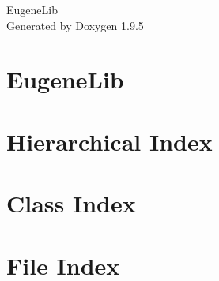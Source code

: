 \documentclass[twoside]{book}
\newcommand{\+}{\discretionary{\mbox{\scriptsize$\hookleftarrow$}}{}{}}
\newcommand{\clearemptydoublepage}{%
    \newpage{\pagestyle{empty}\cleardoublepage}%
  }
\begin{document}
  \raggedbottom
    \hypersetup{pageanchor=false,
                bookmarksnumbered=true,
                pdfencoding=unicode
               }
  \begin{titlepage}
  \vspace*{7cm}
  \begin{center}%
  {\Large Eugene\+Lib}\\
  \vspace*{1cm}
  {\large Generated by Doxygen 1.9.5}\\
  \end{center}
  \end{titlepage}
  \clearemptydoublepage
  \tableofcontents
  \clearemptydoublepage
  \hypersetup{pageanchor=true}
\chapter{Eugene\+Lib}
\label{md__c___users_eugen__desktop__programming__eugene_lib__r_e_a_d_m_e}

\chapter{Hierarchical Index}

\chapter{Class Index}

\chapter{File Index}

\end{document}
